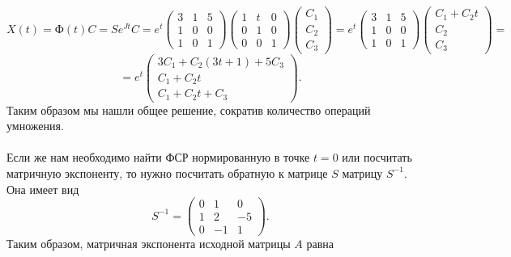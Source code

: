 \documentclass[a4paper, 12pt]{article}
\newcommand{\FI}{\text{Ф}}
\begin{document}
$$X(t) = \FI(t)C = Se^{Jt}C = e^t\begin{pmatrix}
	3 & 1 & 5\\
	1 & 0 & 0\\
	1 & 0 & 1
\end{pmatrix}\begin{pmatrix}
	1 & t & 0\\
	0 & 1 & 0\\
	0 & 0 & 1
\end{pmatrix} \begin{pmatrix}
	C_1\\C_2\\C_3
\end{pmatrix}= e^t\begin{pmatrix}
3 & 1 & 5\\
1 & 0 & 0\\
1 & 0 & 1
\end{pmatrix}\begin{pmatrix}
	C_1 + C_2t\\
	C_2\\
	C_3
\end{pmatrix} =$$ $$= e^t\begin{pmatrix}
	3C_1 + C_2(3t+1) + 5C_3\\
	C_1 + C_2t\\
	C_1 + C_2t + C_3
\end{pmatrix}.$$
Таким образом мы нашли общее решение, сократив количество операций умножения.\\\\
Если же нам необходимо найти ФСР нормированную в точке $t = 0$ или посчитать матричную экспоненту, то нужно посчитать обратную к матрице $S$ матрицу $S^{-1}$. Она имеет вид
$$S^{-1} = \begin{pmatrix}
	0 & 1 & 0\\
	1 & 2 & -5\\
	0 & -1 & 1
\end{pmatrix}.$$
Таким образом, матричная экспонента исходной матрицы $A$ равна
\end{document}
